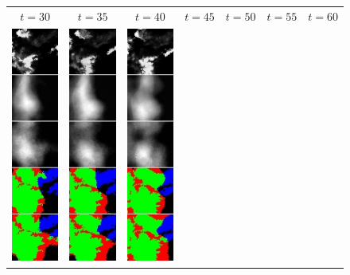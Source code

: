 \begin{figure}[h]
\begin{tabular}{lllllll}
\multicolumn{1}{c}{$t = 30$}  &
\multicolumn{1}{c}{$t = 35$}  &
\multicolumn{1}{c}{$t = 40$}  &
\multicolumn{1}{c}{$t = 45$}  &
\multicolumn{1}{c}{$t = 50$}  &
\multicolumn{1}{c}{$t = 55$}  &
\multicolumn{1}{c}{$t = 60$}  \\

\includegraphics[width=20mm]{abb/prediction/100_maxCont}&
\includegraphics[width=20mm]{abb/prediction/101_maxCont}&
\includegraphics[width=20mm]{abb/prediction/102_maxCont}&

\end{tabular}
\end{figure}
